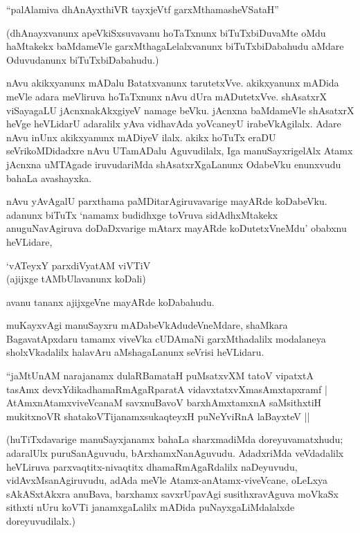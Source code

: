 \begin{shloka}
``palAlamiva dhAnAyxthiVR tayxjeVtf garxMthamasheVSataH''
\end{shloka}

(dhAnayxvanunx apeVkiSxsuvavanu hoTaTxnunx biTuTxbiDuvaMte oMdu haMtakekx baMdameVle garxMthagaLelalxvanunx biTuTxbiDabahudu aMdare Oduvudanunx biTuTxbiDabahudu.)

nAvu akikxyanunx mADalu Batatxvanunx tarutetxVve. akikxyanunx mADida meVle adara meVliruva hoTaTxnunx nAvu dUra mADutetxVve. shAsatxrX viSayagaLU jAcnxnakAkxgiyeV namage beVku. jAcnxna baMdameVle shAsatxrX heVge heVLidarU adaralilx yAva vidhavAda yoVcaneyU irabeVkAgilalx. Adare nAvu inUnx akikxyanunx mADiyeV ilalx. akikx hoTuTx eraDU seVrikoMDidadxre nAvu UTamADalu Aguvudilalx, Iga manuSayxrigelAlx Atamx jAcnxna uMTAgade iruvudariMda shAsatxrXgaLanunx OdabeVku enunxvudu bahaLa avashayxka.

nAvu yAvAgalU parxthama paMDitarAgiruvavarige mayARde koDabeVku. adanunx biTuTx `namamx budidhxge toVruva sidAdhxMtakekx anuguNavAgiruva doDaDxvarige mAtarx mayARde koDutetxVneMdu' obabxnu heVLidare,

\begin{shloka}
`vATeyxY parxdiVyatAM viVTiV\\
(ajijxge tAMbUlavanunx koDali)
\end{shloka}

avanu tananx ajijxgeVne mayARde koDabahudu.

muKayxvAgi manuSayxru mADabeVkAdudeVneMdare, shaMkara BagavatApxdaru tamamx viveVka cUDAmaNi garxMthadalilx modalaneya sholxVkadalilx halavAru aMshagaLanunx seVrisi heVLidaru.

\begin{shloka}
``jaMtUnAM narajanamx dulaRBamataH puMsatxvXM tatoV vipatxtA\\
tasAmx devxYdikadhamaRmAgaRparatA vidavxtatxvXmasAmxtapxramf |\\
AtAmxnAtamxviveVcanaM savxnuBavoV barxhAmxtamxnA saMsithxtiH\\
mukitxnoVR shatakoVTijanamxsukaqteyxH puNeYviRnA laBayxteV ||
\end{shloka}

(huTiTxdavarige manuSayxjanamx bahaLa sharxmadiMda doreyuvamatxhudu; adaralUlx puruSanAguvudu, bArxhamxNanAguvudu. AdadxriMda veVdadalilx heVLiruva parxvaqtitx-nivaqtitx dhamaRmAgaRdalilx naDeyuvudu, vidAvxMsanAgiruvudu, adAda meVle Atamx-anAtamx-viveVcane, oLeLxya sAkASxtAkxra anuBava, barxhamx savxrUpavAgi susithxravAguva moVkaSx sithxti nUru koVTi janamxgaLalilx mADida puNayxgaLiMdalalxde doreyuvudilalx.)

